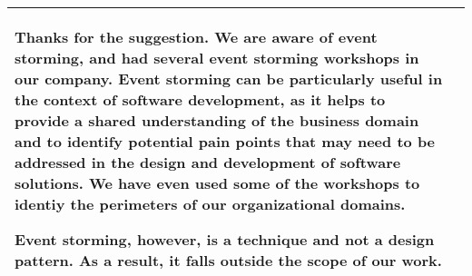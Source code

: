 \documentclass{article}
\begin{document}
\begin{longtable}{|p{7cm}|p{7cm}|}
    Thanks for the suggestion. We are aware of event storming, and had several event storming workshops in our company. Event storming can be particularly useful in the context of software development, as it helps to provide a shared understanding of the business domain and to identify potential pain points that may need to be addressed in the design and development of software solutions. We have even used some of the workshops to identiy the perimeters of our organizational domains. 

    Event storming, however, is a technique and not a design pattern. As a result, it falls outside the scope of our work.
    \\ \hline


    \end{longtable}
\end{document}
